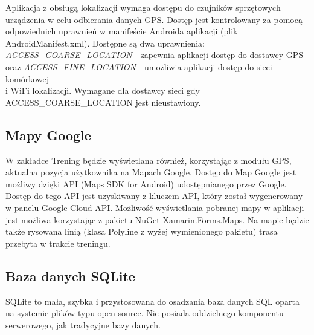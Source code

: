\hspace{0.60cm}Aplikacja z obsługą lokalizacji wymaga dostępu do czujników sprzętowych urządzenia w celu odbierania danych GPS. Dostęp jest kontrolowany za pomocą odpowiednich uprawnień w manifeście Androida aplikacji (plik AndroidManifest.xml). Dostępne są dwa uprawnienia: \\ \textit{ACCESS\_COARSE\_LOCATION} - zapewnia aplikacji dostęp do dostawcy GPS \\ oraz 
\textit{ACCESS\_FINE\_LOCATION} - umożliwia aplikacji dostęp do sieci komórkowej \\ i WiFi lokalizacji. Wymagane dla dostawcy sieci gdy ACCESS\_COARSE\_LOCATION jest nieustawiony.

\subsection{Mapy Google}  %

\hspace{0.60cm}W zakładce Trening będzie wyświetlana również, korzystając z modułu GPS, aktualna pozycja użytkownika na Mapach Google. Dostęp do Map Google jest możliwy dzięki API (Maps SDK for Android) udostępnianego przez Google. Dostęp do tego API jest uzyskiwany z kluczem API, który został wygenerowany w panelu Google Cloud API. Możliwość wyświetlania pobranej mapy w aplikacji jest możliwa korzystając z pakietu NuGet Xamarin.Forms.Maps. Na mapie będzie także rysowana linią (klasa Polyline z wyżej wymienionego pakietu) trasa przebyta w trakcie treningu. 

\subsection{Baza danych SQLite}

\hspace{0.60cm}SQLite to mała, szybka i przystosowana do osadzania baza danych SQL oparta na systemie plików typu open source. Nie posiada oddzielnego komponentu serwerowego, jak tradycyjne bazy danych.


